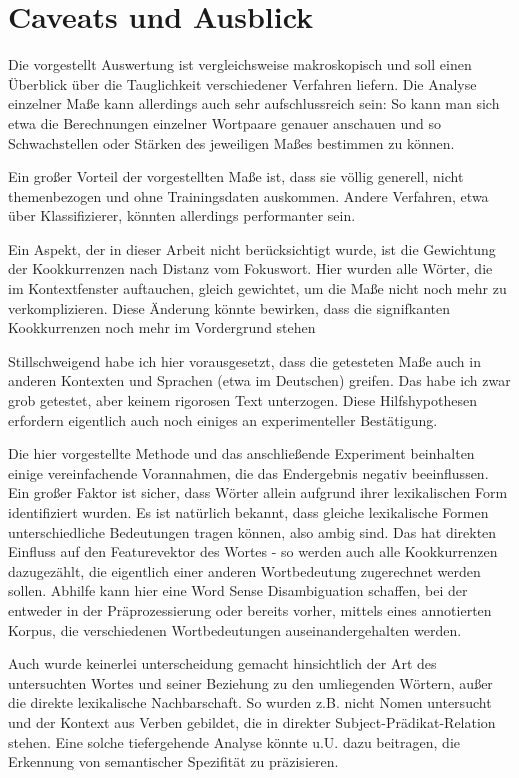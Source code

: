 \documentclass[11pt,numbers=noenddot]{scrartcl}
\begin{document}
\section{Caveats und Ausblick} \label{ausblick}

Die vorgestellt Auswertung ist vergleichsweise makroskopisch und soll einen Überblick über die Tauglichkeit verschiedener Verfahren liefern. Die Analyse einzelner Maße kann allerdings auch sehr aufschlussreich sein: So kann man sich etwa die Berechnungen einzelner Wortpaare genauer anschauen und so Schwachstellen oder Stärken des jeweiligen Maßes bestimmen zu können.

Ein großer Vorteil der vorgestellten Maße ist, dass sie völlig generell, nicht themenbezogen und ohne Trainingsdaten auskommen. Andere Verfahren, etwa über Klassifizierer, könnten allerdings performanter sein.

Ein Aspekt, der in dieser Arbeit nicht berücksichtigt wurde, ist die Gewichtung der Kookkurrenzen nach Distanz vom Fokuswort. Hier wurden alle Wörter, die im Kontextfenster auftauchen, gleich gewichtet, um die Maße nicht noch mehr zu verkomplizieren. Diese Änderung könnte bewirken, dass die signifkanten Kookkurrenzen noch mehr im Vordergrund stehen

Stillschweigend habe ich hier vorausgesetzt, dass die getesteten Maße auch in anderen Kontexten und Sprachen (etwa im Deutschen) greifen. Das habe ich zwar grob getestet, aber keinem rigorosen Text unterzogen. Diese Hilfshypothesen erfordern eigentlich auch noch einiges an experimenteller Bestätigung.

Die hier vorgestellte Methode und das anschließende Experiment beinhalten einige vereinfachende Vorannahmen, die das Endergebnis negativ beeinflussen. Ein großer Faktor ist sicher, dass Wörter allein aufgrund ihrer lexikalischen Form identifiziert wurden. Es ist natürlich bekannt, dass gleiche lexikalische Formen unterschiedliche Bedeutungen tragen können, also ambig sind. Das hat direkten Einfluss auf den Featurevektor des Wortes - so werden auch alle Kookkurrenzen dazugezählt, die eigentlich einer anderen Wortbedeutung zugerechnet werden sollen. Abhilfe kann hier eine Word Sense Disambiguation schaffen, bei der entweder in der Präprozessierung oder bereits vorher, mittels eines annotierten Korpus, die verschiedenen Wortbedeutungen auseinandergehalten werden.

Auch wurde keinerlei unterscheidung gemacht hinsichtlich der Art des untersuchten Wortes und seiner Beziehung zu den umliegenden Wörtern, außer die direkte lexikalische Nachbarschaft. So wurden z.B. nicht Nomen untersucht und der Kontext aus Verben gebildet, die in direkter Subject-Prädikat-Relation stehen. Eine solche tiefergehende Analyse könnte u.U. dazu beitragen, die Erkennung von semantischer Spezifität zu präzisieren.
\end{document}
